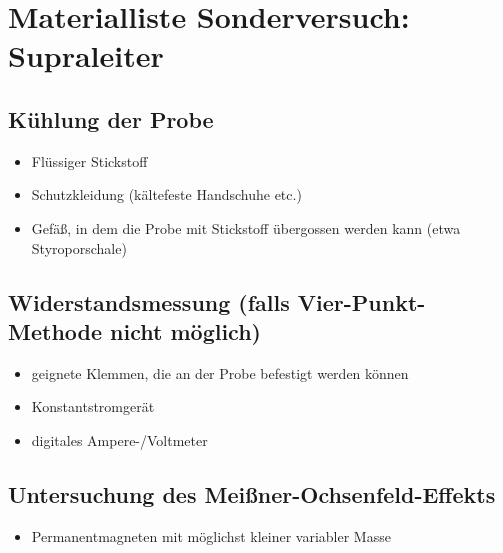 


\section*{Materialliste Sonderversuch: Supraleiter}
\subsection*{Kühlung der Probe}
\begin{itemize}
  \item Flüssiger Stickstoff
  \item Schutzkleidung (kältefeste Handschuhe etc.)
  \item Gefäß, in dem die Probe mit Stickstoff übergossen werden kann (etwa Styroporschale)
\end{itemize}

\subsection*{Widerstandsmessung (falls Vier-Punkt-Methode nicht möglich)}
\begin{itemize}
  \item geignete Klemmen, die an der Probe befestigt werden können
  \item Konstantstromgerät
  \item digitales Ampere-/Voltmeter
\end{itemize}

\subsection*{Untersuchung des Meißner-Ochsenfeld-Effekts}
\begin{itemize}
  \item Permanentmagneten mit möglichst kleiner variabler Masse
\end{itemize}


